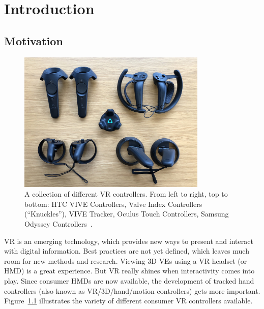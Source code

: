 \chapter{Introduction}\label{chapter:introduction}

\section{Motivation}\label{section:motivation}

\begin{figure}[H]%
  \centering%
  \includegraphics[width=9cm]{figures/introduction/vr_controllers.jpg}%
  \caption[Collection of VR controllers]{A collection of different \ac{VR} controllers. From left to right, top to bottom: HTC VIVE Controllers, Valve Index Controllers (\enquote{Knuckles}), VIVE Tracker, Oculus Touch Controllers, Samsung Odyssey Controllers~\cite{Yang.2018}.}\label{fig:vr-controllers}
\end{figure}

\ac{VR} is an emerging technology, which provides new ways to present and interact with digital information. Best practices are not yet defined, which leaves much room for new methods and research. Viewing \ac{3D} \acp{VE} using a \ac{VR} headset (or \ac{HMD}) is a great experience. But \ac{VR} really shines when interactivity comes into play. Since consumer \acp{HMD} are now available, the development of tracked hand controllers (also known as \ac{VR}/\ac{3D}/hand/motion controllers) gets more important. Figure~\ref{fig:vr-controllers} illustrates the variety of different consumer \ac{VR} controllers available.

